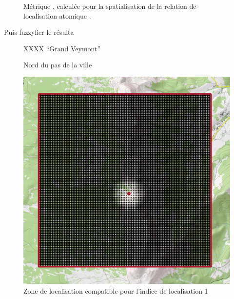 \begin{figure}
  \centering
  
  \caption{Métrique \protect{}, calculée pour la
    spatialisation de la relation de localisation atomique
    \protect{}.}
  \label{fig:veyont_distance}
\end{figure}

Puis fuzzyfier le résulta

%   


\begin{figure}
  \centering
  
  \caption{XXXX \enquote{Grand Veymont}}
  \label{fig:fuzzy_veyont_angleNord}
\end{figure}


\begin{figure}
  \centering
  
  \caption{Nord du pas de la ville}
  \label{fig:ZLC_Nord_Pas_Ville}
\end{figure}


\begin{figure}
  \centering
  \includegraphics{../figures/Exterieur_PasVille_GrandVeymont.png}
  \caption{Zone de localisation compatible pour l'indice de
    localisation 1}
\end{figure}


